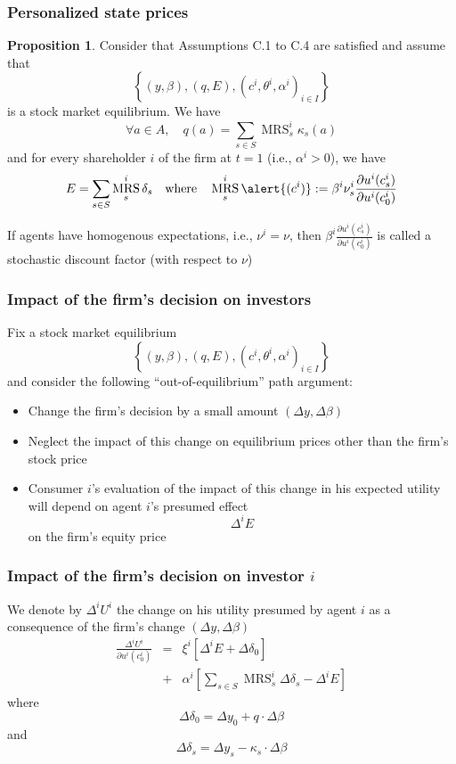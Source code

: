 \documentclass[blue]{beamer}
\DeclareMathOperator\MRS{MRS}
\theoremstyle{definition}
\theoremstyle{example}
\newtheorem*{proposition}{Proposition}
\begin{document}

\begin{frame}\frametitle{Personalized state prices}


\begin{proposition}
Consider that Assumptions C.1 to C.4 are satisfied and assume that
\[
\left\{ (y,\beta), (q,E), (c^i,\theta^i,\alpha^i)_{i\in I}\right\}
\]
is a stock market equilibrium.
We have
\[
\forall a \in A, \quad q(a) = \sum_{s\in S} \MRS^i_s \kappa_s(a)
\]
and for every shareholder $i$ of the firm at $t=1$ (i.e., $\alpha^i>0$), we have
\[
E = \sum_{s\in S} \MRS^i_s \delta_s \quad \textrm{where} \quad \MRS^i_s\alert{(c^i)} := \beta^i \nu^i_s \frac{ \partial u^i(c^i_s)}{\partial u^i(c^i_0)}
\]
\end{proposition}
If agents have homogenous expectations, i.e., $\nu^i = \nu$, then $\beta^i \frac{ \partial u^i(c^i_s)}{\partial u^i(c^i_0)}$ is called a stochastic discount factor (with respect to $\nu$)

\end{frame}


\begin{frame}\frametitle{Impact of the firm's decision on investors}

Fix a stock market equilibrium
\[
\left\{ (y,\beta), (q,E), (c^i,\theta^i,\alpha^i)_{i\in I}\right\}
\]
and consider the following ``out-of-equilibrium'' path argument:
\begin{itemize}
\item Change the firm's decision by a small amount $(\Delta y, \Delta \beta)$
\item Neglect the impact of this change on equilibrium prices other than the firm's stock price
\item Consumer $i$'s evaluation of the impact of this change in his expected utility will depend on agent $i$'s presumed effect
\[
\Delta^i E
\]
on the firm's equity price
\end{itemize}

\end{frame}


\begin{frame}\frametitle{Impact of the firm's decision on investor $i$}

We denote by $\Delta^i U^i$ the change on his utility presumed by agent $i$ as a consequence of the firm's change $(\Delta y, \Delta \beta)$
\begin{eqnarray*}
\frac{\Delta^i U^i}{\partial u^i(c^i_0)} & = & \xi^i \left[ \Delta^i E + \Delta \delta_0\right]  \\
& + & \alpha^i \left[ \sum_{s\in S} \MRS^i_s \Delta \delta_s - \Delta^i E \right]
\end{eqnarray*}
where
\[
\Delta \delta_0 = \Delta y_0 + q \cdot \Delta \beta
\]
and
\[
\Delta \delta_s = \Delta y_s - \kappa_s \cdot \Delta \beta
\]

\end{frame}
\end{document}
